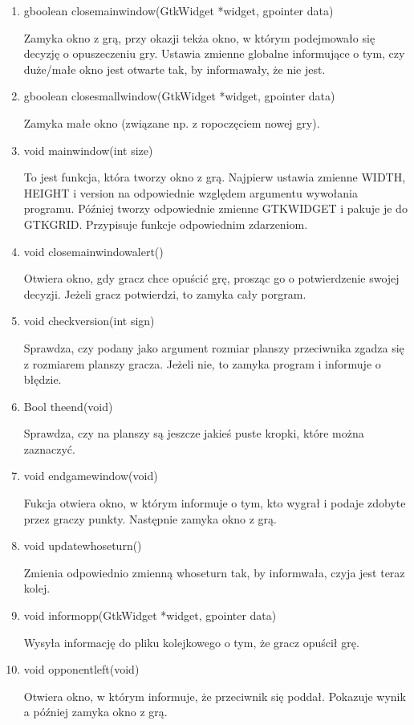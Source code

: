 \documentclass{article}
\begin{document}
\begin{enumerate}
\item gboolean close\textunderscore main\textunderscore window(GtkWidget *widget, gpointer data)

Zamyka okno z grą, przy okazji tekża okno, w którym podejmowało się decyzję o opuszeczeniu gry. Ustawia zmienne globalne informujące o tym, czy duże/małe okno jest otwarte tak, by informawały, że nie jest.

\item gboolean close\textunderscore small\textunderscore window(GtkWidget *widget, gpointer data)

Zamyka małe okno (związane np. z ropoczęciem nowej gry).

\item void main\textunderscore window(int size)

To jest funkcja, która tworzy okno z grą. Najpierw ustawia zmienne WIDTH, HEIGHT i version na odpowiednie względem argumentu wywołania programu. Później tworzy odpowiednie zmienne GTK\textunderscore WIDGET i pakuje je do GTK\textunderscore GRID. Przypisuje funkcje odpowiednim zdarzeniom.

\item void close\textunderscore main\textunderscore window\textunderscore alert()

Otwiera okno, gdy gracz chce opuścić grę, prosząc go o potwierdzenie swojej decyzji. Jeżeli gracz potwierdzi, to zamyka cały porgram.

\item void check\textunderscore version(int sign)

Sprawdza, czy podany jako argument rozmiar planszy przeciwnika zgadza się z rozmiarem planszy gracza. Jeżeli nie, to zamyka program i informuje o błędzie.

\item \textunderscore Bool the\textunderscore end(void)

Sprawdza, czy na planszy są jeszcze jakieś puste kropki, które można zaznaczyć.

\item void end\textunderscore game\textunderscore window(void)

Fukcja otwiera okno, w którym informuje o tym, kto wygrał i podaje zdobyte przez graczy punkty. Następnie zamyka okno z grą.

\item void update\textunderscore whose\textunderscore turn()

Zmienia odpowiednio zmienną whose\textunderscore turn tak, by informwała, czyja jest teraz kolej.

\item void inform\textunderscore opp(GtkWidget *widget, gpointer data)

Wysyła informację do pliku kolejkowego o tym, że gracz opuścił grę.

\item void opponent\textunderscore left(void)

Otwiera okno, w którym informuje, że przeciwnik się poddał. Pokazuje wynik a później zamyka okno z grą.

\end{enumerate}
\end{document}

